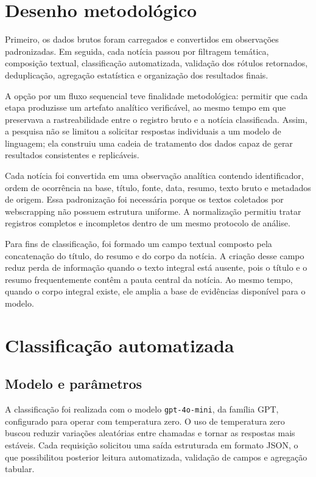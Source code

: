 \documentclass[12pt,a4paper]{article}
\begin{document}
\section{Desenho metodológico}

Primeiro, os dados brutos foram carregados e convertidos em observações padronizadas. Em seguida, cada notícia passou por filtragem temática, composição textual, classificação automatizada, validação dos rótulos retornados, deduplicação, agregação estatística e organização dos resultados finais.

A opção por um fluxo sequencial teve finalidade metodológica: permitir que cada etapa produzisse um artefato analítico verificável, ao mesmo tempo em que preservava a rastreabilidade entre o registro bruto e a notícia classificada. Assim, a pesquisa não se limitou a solicitar respostas individuais a um modelo de linguagem; ela construiu uma cadeia de tratamento dos dados capaz de gerar resultados consistentes e replicáveis.

Cada notícia foi convertida em uma observação analítica contendo identificador, ordem de ocorrência na base, título, fonte, data, resumo, texto bruto e metadados de origem. Essa padronização foi necessária porque os textos coletados por webscrapping não possuem estrutura uniforme. A normalização permitiu tratar registros completos e incompletos dentro de um mesmo protocolo de análise.

Para fins de classificação, foi formado um campo textual composto pela concatenação do título, do resumo e do corpo da notícia. A criação desse campo reduz perda de informação quando o texto integral está ausente, pois o título e o resumo frequentemente contêm a pauta central da notícia. Ao mesmo tempo, quando o corpo integral existe, ele amplia a base de evidências disponível para o modelo.

\section{Classificação automatizada}

\subsection{Modelo e parâmetros}

A classificação foi realizada com o modelo \texttt{gpt-4o-mini}, da família GPT, configurado para operar com temperatura zero. O uso de temperatura zero buscou reduzir variações aleatórias entre chamadas e tornar as respostas mais estáveis. Cada requisição solicitou uma saída estruturada em formato JSON, o que possibilitou posterior leitura automatizada, validação de campos e agregação tabular.
\end{document}
